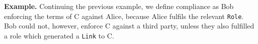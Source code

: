 \documentclass{article}
\numberwithin{equation}{section}
\newcommand{\quickexample}[1]{
\begin{tcolorbox}
	\textbf{Example.} #1
\end{tcolorbox}
}
\begin{document}
\vspace{0.25cm}
\quickexample{
	Continuing the previous example, we define compliance as Bob enforcing the terms of C against Alice, because Alice fulfils the relevant \texttt{Role}. Bob could not, however, enforce C against a third party, unless they also fulfilled a role which generated a \texttt{Link} to C.
}


\end{document}
